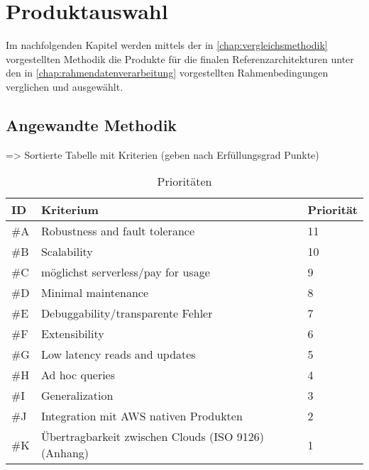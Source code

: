 \chapter{Produktauswahl}
Im nachfolgenden Kapitel werden mittels der in \autoref{chap:vergleichsmethodik} vorgestellten Methodik die Produkte für die finalen Referenzarchitekturen unter den in \autoref{chap:rahmendatenverarbeitung} vorgestellten Rahmenbedingungen verglichen und ausgewählt.

\section{Angewandte Methodik}
=> Sortierte Tabelle mit Kriterien (geben nach Erfüllungsgrad Punkte)
\begin{table}[H]
\centering
\begin{tabular}{|l|l|l|}
\hline
ID & Kriterium & Priorität \\ \hline
\#A & Robustness and fault tolerance & 11 \\ \hline
\#B & Scalability & 10 \\ \hline
\#C & möglichst serverless/pay for usage & 9 \\ \hline
\#D & Minimal maintenance & 8 \\ \hline
\#E & Debuggability/transparente Fehler & 7 \\ \hline
\#F & Extensibility & 6 \\ \hline
\#G & Low latency reads and updates & 5 \\ \hline
\#H & Ad hoc queries & 4 \\ \hline
\#I & Generalization & 3 \\ \hline
\#J & Integration mit \ac{AWS} nativen Produkten & 2 \\ \hline
\#K & Übertragbarkeit zwischen Clouds (ISO 9126) (Anhang) & 1 \\ \hline
\end{tabular}
\caption{Prioritäten}
\label{tab:prioritaeten}
\end{table}

